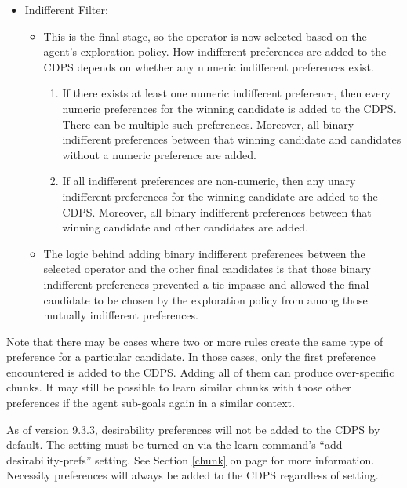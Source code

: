 \begin{itemize}
\item Indifferent Filter: 
	\begin{itemize}
	\item This is the final stage, so the operator is now selected based on the agent's exploration policy.  How indifferent preferences are added to the CDPS depends on whether any numeric indifferent preferences exist.
		\begin{enumerate}
		\item If there exists at least one numeric indifferent preference, then every numeric preferences for the winning candidate is added to the CDPS.  There can be multiple such preferences. Moreover, all binary indifferent preferences between that winning candidate and candidates without a numeric preference are added.
		\item If all indifferent preferences are non-numeric, then any unary indifferent preferences for the winning candidate are added to the CDPS.  Moreover, all binary indifferent preferences between that winning candidate and other candidates are added.
		\end{enumerate}
	\item The logic behind adding binary indifferent preferences between the selected operator and the other final candidates is that those binary indifferent preferences prevented a tie impasse and allowed the final candidate to be chosen by the exploration policy from among those mutually indifferent preferences.
	\end{itemize}
\end{itemize}

Note that there may be cases where two or more rules create the same type of
preference for a particular candidate.  In those cases, only the first
preference encountered is added to the CDPS.  Adding all of them can produce
over-specific chunks.  It may still be
possible to learn similar chunks with those other preferences if the agent sub-goals
again in a similar context.

As of version 9.3.3, desirability preferences will not be added to the CDPS by
default.  The setting must be turned on via the learn command's
“add-desirability-prefs” setting.  See Section \ref{chunk} on page \pageref{chunk} for more
information.  Necessity preferences will always be added to the CDPS regardless
of setting.

